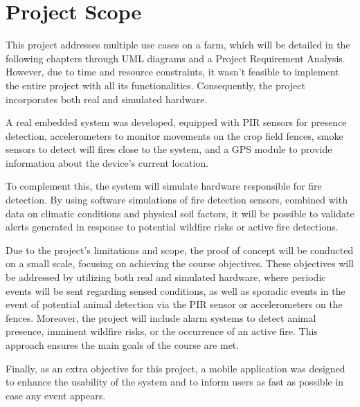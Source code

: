 \section{Project Scope}
This project addresses multiple use cases on a farm, which will be detailed in the following chapters through UML diagrams and a 
Project Requirement Analysis. However, due to time and resource constraints, it wasn't feasible to implement the entire project 
with all its functionalities. Consequently, the project incorporates both real and simulated hardware.

A real embedded system was developed, equipped with PIR sensors for presence detection, accelerometers to monitor movements on
the crop field fences, smoke sensors to detect will fires close to the system, and a GPS module to provide information about the device’s current location.

To complement this, the system will simulate hardware responsible for fire detection. By using software simulations of fire detection
sensors, combined with data on climatic conditions and physical soil factors, it will be possible to validate alerts generated in response
to potential wildfire risks or active fire detections.

Due to the project’s limitations and scope, the proof of concept will be conducted on a small scale, focusing on achieving the course objectives.
These objectives will be addressed by utilizing both real and simulated hardware, where periodic events will be sent regarding sensed conditions,
as well as sporadic events in the event of potential animal detection via the PIR sensor or accelerometers on the fences. Moreover, the project will
include alarm systems to detect animal presence, imminent wildfire risks, or the occurrence of an active fire. This approach ensures the main goals of the course are met.

Finally, as an extra objective for this project, a mobile application was designed to enhance the usability of the system and to inform users as fast as possible 
in case any event appears.